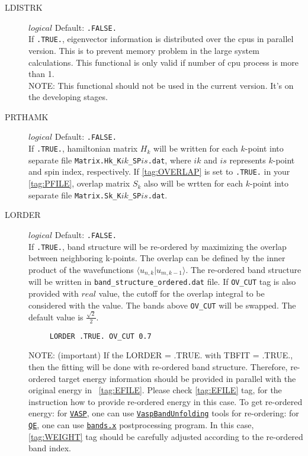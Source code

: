 \documentclass[a4paper,12pt]{scrartcl}
\makeatletter
\def\namedlabel#1#2{\begingroup
    #2%
    \def\@currentlabel{#2}%
    \phantomsection\label{#1}\endgroup
}
\makeatother
\begin{document}
\begin{description}
    \item[\namedlabel{tag:LDISTRK}{LDISTRK}] $logical$ Default: \texttt{.FALSE.} \\
		If \texttt{.TRUE.}, eigenvector information is distributed over the cpus in parallel version.
		This is to prevent memory problem in the large system calculations. 
		This functional is only valid if number of cpu process is more than 1.\\
		NOTE: This functional should not be used in the current version. It's on the developing stages.


    \item[\namedlabel{tag:PRTHAMK}{PRTHAMK}] $logical$ Default: \texttt{.FALSE.} \\
		If \texttt{.TRUE.}, hamiltonian matrix $H_k$ will be written for each $k$-point into separate file \texttt{Matrix.Hk\_K$ik$\_SP$is$.dat}, where $ik$ and $is$ represents $k$-point and spin index, respectively. If \ref{tag:OVERLAP} is set to \texttt{.TRUE.} in your \ref{tag:PFILE}, overlap matrix $S_k$ also will be wrtten for each $k$-point into separate file \texttt{Matrix.Sk\_K$ik$\_SP$is$.dat}.

    \item[\namedlabel{tag:LORDER}{LORDER}] $logical$ Default: \texttt{.FALSE.}  \\
		If \texttt{.TRUE.}, band structure will be re-ordered
        by maximizing the overlap between neighboring k-points. The overlap can be defined by the inner product of the wavefunctions $\langle u_{n,k} | u_{m,k-1} \rangle$. 
        The re-ordered band structure will be written in \texttt{band\_structure\_ordered.dat} file.
        If \texttt{OV\_CUT} tag is also provided with $real$ value, the cutoff for the overlap integral to be considered with the value. The bands above \texttt{OV\_CUT} will be swapped. The default value is $\frac{\sqrt{2}}{2}$. 
           
      \begin{verbatim}
     LORDER .TRUE. OV_CUT 0.7  
     \end{verbatim}
     
     NOTE: (important) If the LORDER = .TRUE. with TBFIT = .TRUE., then the fitting will be done with re-ordered band structure. Therefore, re-ordered target energy information should be provided in parallel with the original energy  in ~\ref{tag:EFILE}. Please check \ref{tag:EFILE} tag, for the instruction how to provide re-ordered energy in this case. To get re-ordered energy: for \href{https://www.vasp.at}{\texttt{VASP}}, one can use \href{https://github.com/QijingZheng/VaspBandUnfolding}{\texttt{VaspBandUnfolding}} tools for re-ordering: for \href{https://www.quantum-espresso.org}{\texttt{QE}}, one can use \href{https://www.quantum-espresso.org/Doc/INPUT_BANDS.html}{\texttt{bands.x}} postprocessing program. 
     	In this case, \ref{tag:WEIGHT} tag should be carefully adjusted according to the re-ordered band index.
        


\end{description}
\end{document}
